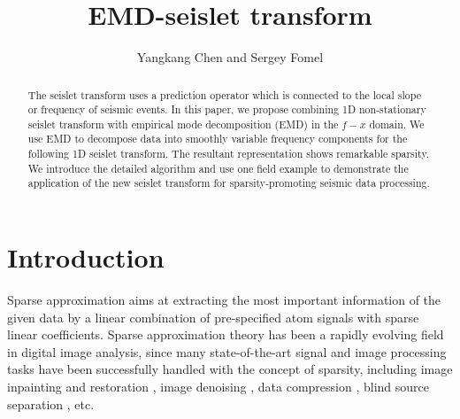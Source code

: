 \title{EMD-seislet transform}
\author{Yangkang Chen and Sergey Fomel}

\maketitle


\begin{abstract}
The seislet transform uses a prediction operator which is connected to the local slope or frequency of seismic events. %
In this paper, we propose combining 1D non-stationary seislet transform with empirical mode decomposition (EMD) in the $f-x$ domain. We use EMD to decompose data into smoothly variable frequency components for the following 1D seislet transform. The resultant representation shows remarkable sparsity. %
We introduce the detailed algorithm and use one field example to demonstrate the application of the new seislet transform for sparsity-promoting seismic data processing.
\end{abstract}

\section{Introduction}
Sparse approximation aims at extracting the most important information of the given data by a linear combination of pre-specified atom signals with sparse linear coefficients. Sparse approximation theory has been a rapidly evolving field in digital image analysis, since many state-of-the-art signal and image processing tasks have been successfully handled with the concept of sparsity, including image inpainting and restoration \cite[]{elad2005,mairal2008,mairal2009,jianfeng2013}, image denoising \cite[]{protter2009,jianfeng2013}, data compression \cite[]{bryt2008}, blind source separation \cite[]{zib2001}, etc.

